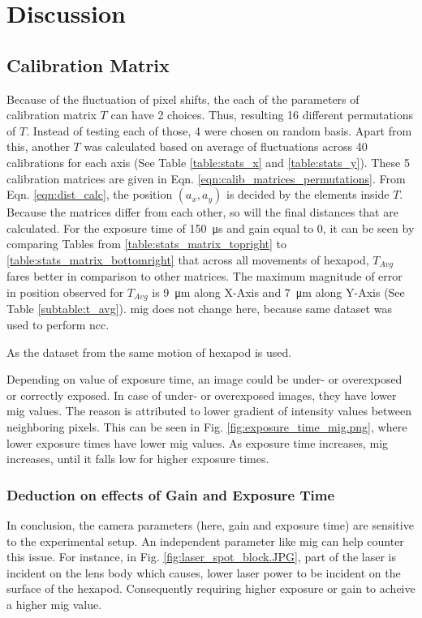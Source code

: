 \chapter{Discussion}\label{chapter:discussion}

\section{Calibration Matrix}
Because of the fluctuation of pixel shifts, the each of the parameters of calibration matrix $T$ can have 2 choices. Thus, resulting 16 different permutations of $T$. Instead of testing each of those, 4 were chosen on random basis. Apart from this, another $T$ was calculated based on average of fluctuations across 40 calibrations for each axis (See Table \ref{table:stats_x} and \ref{table:stats_y}). These 5 calibration matrices are given in Eqn. \ref{eqn:calib_matrices_permutations}. From Eqn. \ref{eqn:dist_calc}, the position $(a_x, a_y)$ is decided by the elements inside $T$. Because the matrices differ from each other, so will the final distances that are calculated. For the exposure time of \SI{150}{\micro\second} and gain equal to $0$, it can be seen by comparing Tables from \ref{table:stats_matrix_topright} to \ref{table:stats_matrix_bottomright} that across all movements of hexapod, $T_{Avg}$ fares better in comparison to other matrices. The maximum magnitude of error in position observed for $T_{Avg}$ is \SI{9}{\micro\meter} along X-Axis and \SI{7}{\micro\meter} along Y-Axis (See Table \ref{subtable:t_avg}). \gls{mig} does not change here, because same dataset was used to perform \gls{ncc}.

As the dataset from the same motion of hexapod is used.

Depending on value of exposure time, an image could be under- or overexposed or correctly exposed. In case of under- or overexposed images, they have lower \gls{mig} values. The reason is attributed to lower gradient of intensity values between neighboring pixels. This can be seen in Fig. \ref{fig:exposure_time_mig.png}, where lower exposure times have lower \gls{mig} values. As exposure time increases, \gls{mig} increases, until it falls low for higher exposure times.

\subsection*{Deduction on effects of Gain and Exposure Time}
\noindent In conclusion, the camera parameters (here, gain and exposure time) are sensitive to the experimental setup. An independent parameter like \gls{mig} can help counter this issue. For instance, in Fig. \ref{fig:laser_spot_block.JPG}, part of the laser is incident on the lens body which causes, lower laser power to be incident on the surface of the hexapod. Consequently requiring higher exposure or gain to acheive a higher \gls{mig} value. 

